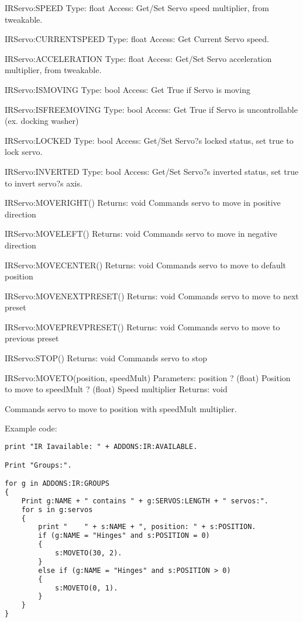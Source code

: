 IRServo:SPEED
Type:	float
Access:	Get/Set
Servo speed multiplier, from tweakable.

IRServo:CURRENTSPEED
Type:	float
Access:	Get
Current Servo speed.

IRServo:ACCELERATION
Type:	float
Access:	Get/Set
Servo acceleration multiplier, from tweakable.

IRServo:ISMOVING
Type:	bool
Access:	Get
True if Servo is moving

IRServo:ISFREEMOVING
Type:	bool
Access:	Get
True if Servo is uncontrollable (ex. docking washer)

IRServo:LOCKED
Type:	bool
Access:	Get/Set
Servo?s locked status, set true to lock servo.

IRServo:INVERTED
Type:	bool
Access:	Get/Set
Servo?s inverted status, set true to invert servo?s axis.

IRServo:MOVERIGHT()
Returns:	void
Commands servo to move in positive direction

IRServo:MOVELEFT()
Returns:	void
Commands servo to move in negative direction

IRServo:MOVECENTER()
Returns:	void
Commands servo to move to default position

IRServo:MOVENEXTPRESET()
Returns:	void
Commands servo to move to next preset

IRServo:MOVEPREVPRESET()
Returns:	void
Commands servo to move to previous preset

IRServo:STOP()
Returns:	void
Commands servo to stop

IRServo:MOVETO(position, speedMult)
Parameters:	
position ? (float) Position to move to
speedMult ? (float) Speed multiplier
Returns:	
void

Commands servo to move to position with speedMult multiplier.

Example code:

\begin{lstlisting}[frame=single,language=XML]
print "IR Iavailable: " + ADDONS:IR:AVAILABLE.

Print "Groups:".

for g in ADDONS:IR:GROUPS
{
    Print g:NAME + " contains " + g:SERVOS:LENGTH + " servos:".
    for s in g:servos
    {
        print "    " + s:NAME + ", position: " + s:POSITION.
        if (g:NAME = "Hinges" and s:POSITION = 0)
        {
            s:MOVETO(30, 2).
        }
        else if (g:NAME = "Hinges" and s:POSITION > 0)
        {
            s:MOVETO(0, 1).
        }
    }
}
\end{lstlisting}